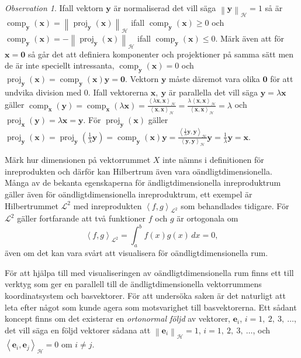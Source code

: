 \documentclass[a4paper, 12pt]{report}
\theoremstyle{definition}
\theoremstyle{remark}
\newtheorem*{rem}{Observation}
\newcommand{\bfx}{\mathbf{x}}
\newcommand{\bfy}{\mathbf{y}}
\newcommand{\llangle}{\left\langle}
\newcommand{\rrangle}{\right\rangle}
\newcommand{\inner}[2]{\llangle #1, #2 \rrangle}
\newcommand{\hil}{\mathcal{H}}
\begin{document}
\begin{rem}
	Ifall vektorn $\bfy$ är normaliserad det vill säga $\left\|\bfy\right\|_\hil=1$ så är $\operatorname{comp}_\bfy\!\left(\bfx\right)=\left\|\operatorname{proj}_\bfy\!\left(\bfx\right)\right\|_\hil$ ifall $\operatorname{comp}_\bfy\!\left(\bfx\right)\geq0$ och $\operatorname{comp}_\bfy\!\left(\bfx\right)=-\!\left\|\operatorname{proj}_\bfy\!\left(\bfx\right)\right\|_\hil$ ifall $\operatorname{comp}_\bfy\left(\bfx\right)\leq0$.
	Märk även att för $\bfx=\mathbf{0}$ så går det att definiera komponenter och projektioner på samma sätt men de är inte speciellt intressanta, $\operatorname{comp}_\bfy\left(\bfx\right)=0$ och $\operatorname{proj}_\bfy\left(\bfx\right)=\operatorname{comp}_\bfy\left(\bfx\right)\bfy=\mathbf{0}$.
	Vektorn $\bfy$ måste däremot vara olika $\mathbf{0}$ för att undvika division med 0.
	Ifall vektorerna $\bfx,~\bfy$ är parallella det vill säga $\bfy=\lambda\bfx$ gäller $\operatorname{comp}_\bfx\left(\bfy\right) = \operatorname{comp}_\bfx\left(\lambda\bfx\right) = \frac{\inner{\lambda \bfx}{\bfx}_\hil}{\inner{\bfx}{\bfx}_\hil} = \frac{\lambda \inner{\bfx}{\bfx}_\hil}{\inner{\bfx}{\bfx}_\hil}=\lambda$ och $\operatorname{proj}_\bfx\left(\bfy\right)=\lambda\bfx=\bfy$. För $\operatorname{proj}_\bfy\left(\bfx\right)$ gäller $\operatorname{proj}_\bfy\left(\bfx\right) = \operatorname{proj}_\bfy\left(\frac{1}{\lambda}\bfy\right)=\operatorname{comp}_\bfy\left(\bfx\right)\bfy = \frac{\inner{\frac{1}{\lambda}\bfy}{\bfy}_\hil}{\inner{\bfy}{\bfy}_\hil}\bfy= \frac{1}{\lambda}\bfy=\bfx$.
\end{rem}

Märk hur dimensionen på vektorrummet $X$ inte nämns i definitionen för inreprodukten och därför kan Hilbertrum även vara oändligtdimensionella. Många av de bekanta egenskaperna för ändligtdimensionella inreproduktrum gäller även för oändligtdimensionella inreproduktrum, ett exempel är Hilbertrummet $\mathcal{L}^2$ med inreprodukten $\inner{f}{g}_{\mathcal{L}^2}$ som behandlades tidigare. För $\mathcal{L}^2$ gäller fortfarande att två funktioner $f$ och $g$ är ortogonala om
\begin{equation*}
	\inner{f}{g}_{\mathcal{L}^2}=\int_{a}^{b}f(x)g(x) \, dx=0,
\end{equation*}
även om det kan vara svårt att visualisera för oändligtdimensionella rum.

För att hjälpa till med visualiseringen av oändligtdimensionella rum finns ett till verktyg som ger en parallell till de ändligtdimensionella vektorrummens koordinatsystem och basvektorer. För att undersöka saken är det naturligt att leta efter något som kunde agera som motsvarighet till basvektorerna. Ett sådant koncept finns om det existerar en \emph{ortonormal följd} av vektorer, $\mathbf{e}_i$, $i=1,~2,~3,~\dots$, det vill säga en följd vektorer sådana att $\left\|\mathbf{e}_i\right\|_\hil=1$, $i=1,~2,~3,~\dots$, och $\inner{\mathbf{e}_i}{\mathbf{e}_j}_\hil=0$ om $i\neq j$.
\end{document}
